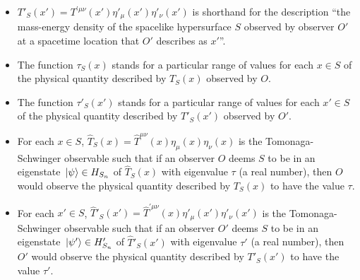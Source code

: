 \begin{itemize}
\item $T'_S(x')={T}^{\prime\mu\nu}(x')\eta'_{\mu}(x')\eta'_{\nu}(x')$ is shorthand for the description ``the mass-energy density of the spacelike hypersurface $S$ observed by observer $O'$ at a spacetime location that $O'$ describes as $x'$''. 
\item The function $\tau_S(x)$ stands for a particular range of values for each $x\in S$ of the physical quantity described by $T_S(x)$ observed by $O$. 
\item The function $\tau'_S(x')$ stands for a particular range of values for each $x'\in S$ of the physical quantity described by $T'_S(x')$ observed by $O'$. 
\item For each $x\in S$, $\hat{T}_S(x)=\hat{T}^{\mu\nu}(x)\eta_{\mu}(x)\eta_{\nu}(x)$ is the Tomonaga-Schwinger observable  such that if an observer $O$ deems $S$ to be in an eigenstate $\ket*{\psi}\in H_{S_n}$ of  $\hat{T}_S(x)$ with eigenvalue $\tau$ (a real number), then  $O$ would observe the physical quantity described by  $T_S(x)$ to have the value $\tau$. 
\item For each $x'\in S$, $\hat{T}'_S(x')=\hat{T}^{\prime\mu\nu}(x)\eta'_{\mu}(x')\eta'_{\nu}(x')$ is the Tomonaga-Schwinger observable  such that if an observer $O'$ deems $S$ to be in an eigenstate $\ket*{\psi'}\in H'_{S_n}$ of  $\hat{T}'_S(x')$ with eigenvalue $\tau'$ (a real number), then  $O'$ would observe the physical quantity described by  $T'_S(x')$ to have the value $\tau'$. 
\end{itemize}



